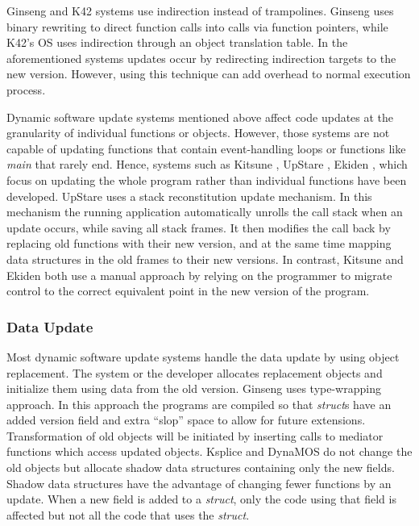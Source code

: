 \documentclass[a4paper,11pt,twoside]{article}
\begin{document}
Ginseng \cite{Ginseng} and K42 \cite{K42} systems use indirection instead of trampolines. Ginseng uses binary rewriting to direct function calls into calls via function pointers, while K42's OS uses indirection through an object translation table. In the aforementioned systems updates occur by redirecting indirection targets to the new version. However, using this technique can add overhead to normal execution process. 

Dynamic software update systems mentioned above affect code updates at the granularity of individual functions or objects. However, those systems are not capable of updating functions that contain event-handling loops or functions like \textit{main} that rarely end. Hence, systems such as Kitsune  \cite{Kitsune}, UpStare  \cite{UpStare}, Ekiden  \cite{Eiken}, which focus on updating the whole program rather than individual functions have been developed. UpStare uses a stack reconstitution update mechanism. In this mechanism the running application automatically unrolls the call stack when an update occurs, while saving all stack frames. It then modifies the call back by replacing old functions with their new version, and at the same time mapping data structures in the old frames to their new versions. In contrast, Kitsune and Ekiden both use a manual approach by relying on the programmer to migrate control to the correct equivalent point in the new version of the program.


\subsubsection{Data Update} 
Most dynamic software update systems handle the data update by using object replacement. The system or the developer allocates replacement objects and initialize them using data from the old version. Ginseng uses type-wrapping approach. In this approach the programs are compiled so that \textit{struct}s have an added version field and extra “slop” space to allow for future extensions. Transformation of old objects will be initiated by inserting calls to mediator functions which access updated objects. Ksplice and DynaMOS do not change the old objects but allocate shadow data structures containing only the new fields. Shadow data structures have the advantage of changing fewer functions by an update. When a new field is added to a \textit{struct}, only the code using that field is affected but not all the code that uses the \textit{struct}. 
\end{document}
